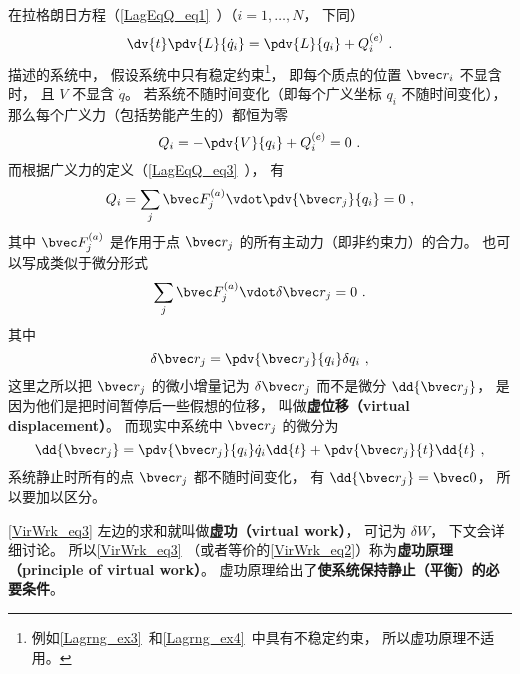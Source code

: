 
\begin{issues}
\issueTODO
\end{issues}


在拉格朗日方程（\autoref{LagEqQ_eq1}~）（$i=1,\dots,N$， 下同）
\begin{equation}\label{VirWrk_eq1}
\dv{t} \pdv{L}{\dot q_i} = \pdv{L}{q_i} + Q_i^{(e)}~.
\end{equation}
描述的系统中， 假设系统中只有稳定约束\footnote{例如\autoref{Lagrng_ex3}~和\autoref{Lagrng_ex4}~中具有不稳定约束， 所以虚功原理不适用。}， 即每个质点的位置 $\bvec r_i$ 不显含时， 且 $V$ 不显含 $\dot q$。 若系统不随时间变化（即每个广义坐标 $q_i$ 不随时间变化）， 那么每个广义力（包括势能产生的）都恒为零
\begin{equation}\label{VirWrk_eq2}
Q_i = -\pdv{V}{q_i} + Q_i^{(e)} = 0~.
\end{equation}
而根据广义力的定义（\autoref{LagEqQ_eq3}~）， 有
\begin{equation}
Q_i = \sum_j \bvec F_j^{(a)} \vdot \pdv{\bvec r_j}{q_i} = 0~,
\end{equation}
其中 $\bvec F_j^{(a)}$ 是作用于点 $\bvec r_j$ 的所有主动力（即非约束力）的合力。 也可以写成类似于微分形式
\begin{equation}\label{VirWrk_eq3}
\sum_j \bvec F_j^{(a)} \vdot \delta \bvec r_j = 0~.
\end{equation}
其中
\begin{equation}
\delta \bvec r_j = \pdv{\bvec r_j}{q_i}\delta{q_i}~,
\end{equation}
这里之所以把 $\bvec r_j$ 的微小增量记为 $\delta \bvec r_j$ 而不是微分 $\dd{\bvec r_j}$， 是因为他们是把时间暂停后一些假想的位移， 叫做\textbf{虚位移（virtual displacement）}。 而现实中系统中 $\bvec r_j$ 的微分为
\begin{equation}
\dd{\bvec r_j} = \pdv{\bvec r_j}{q_i}\dot{q}_i\dd{t} + \pdv{\bvec r_j}{t}\dd{t}~,
\end{equation}
系统静止时所有的点 $\bvec r_j$ 都不随时间变化， 有 $\dd{\bvec r_j} = \bvec 0$， 所以要加以区分。

\autoref{VirWrk_eq3} 左边的求和就叫做\textbf{虚功（virtual work）}， 可记为 $\delta W$， 下文会详细讨论。 所以\autoref{VirWrk_eq3} （或者等价的\autoref{VirWrk_eq2}）称为\textbf{虚功原理（principle of virtual work）}。 虚功原理给出了\textbf{使系统保持静止（平衡）的必要条件}。

